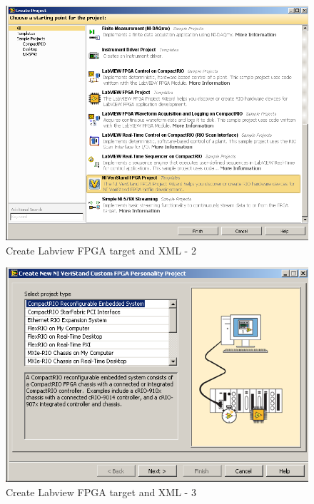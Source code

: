 \documentclass[a4paper,twoside,english]{report}
\begin{document}
\begin{figure}[!h]
\centering \includegraphics[scale=0.45]{Screenshots/Screenshot_2015-01-16_19-23-23.png}
\caption{Create Labview FPGA target and XML - 2}

\label{fig: Create Labview FPGA target and XML-2} 
\end{figure}

\begin{figure}[!h]
\centering \includegraphics[scale=0.45]{Screenshots/Screenshot_2015-01-16_19-23-41.png}
\caption{Create Labview FPGA target and XML - 3}

\label{fig: Create Labview FPGA target and XML-3} 
\end{figure}
\end{document}
